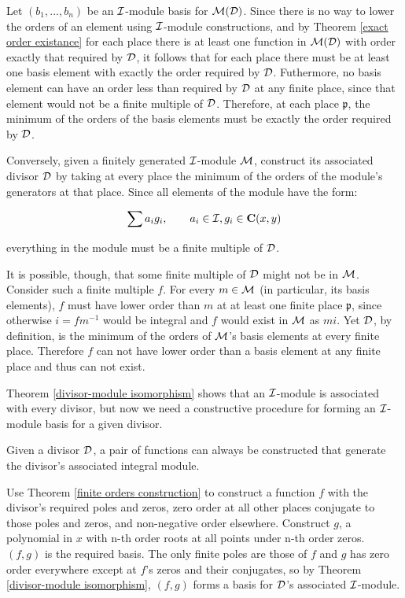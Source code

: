 Let $(b_1,...,b_n)$ be an ${\cal I}$-module basis for ${\cal M}({\cal
D})$.  Since there is no way to lower the orders of an element using
${\cal I}$-module constructions, and by Theorem \ref{exact order
existance} for each place there is at least one function in ${\cal
M}({\cal D})$ with order exactly that required by ${\cal D}$, it
follows that for each place there must be at least one basis element
with exactly the order required by ${\cal D}$.  Futhermore, no basis
element can have an order less than required by ${\cal D}$ at any
finite place, since that element would not be a finite multiple of
${\cal D}$.  Therefore, at each place $\mathfrak{p}$, the minimum of
the orders of the basis elements must be exactly the order required by
${\cal D}$.

Conversely, given a finitely generated ${\cal I}$-module ${\cal M}$,
construct its associated divisor ${\cal D}$ by taking at every place
the minimum of the orders of the module's generators at that place.
Since all elements of the module have the form:

	$$\sum a_i g_i, \qquad a_i \in {\cal I}, g_i \in {\bf C}(x,y)$$

everything in the module must be a finite multiple of ${\cal D}$.

It is possible, though, that some finite multiple of ${\cal D}$ might
not be in ${\cal M}$.  Consider such a finite multiple $f$.  For every
$m \in {\cal M}$ (in particular, its basis elements), $f$ must have
lower order than $m$ at at least one finite place $\mathfrak{p}$,
since otherwise $i = fm^{-1}$ would be integral and $f$ would exist in
${\cal M}$ as $mi$.  Yet ${\cal D}$, by definition, is the minimum of
the orders of ${\cal M}$'s basis elements at every finite place.
Therefore $f$ can not have lower order than a basis element at any
finite place and thus can not exist.

\endtheorem

Theorem \ref{divisor-module isomorphism} shows that an
${\cal I}$-module is associated with every divisor, but
now we need a constructive procedure for forming an ${\cal I}$-module
basis for a given divisor.

\theorem
\label{divisor basis construction}

Given a divisor ${\cal D}$, a pair of functions can always be
constructed that generate the divisor's associated integral module.

\proof

Use Theorem \ref{finite orders construction} to construct a function
$f$ with the divisor's required poles and zeros, zero order at all
other places conjugate to those poles and zeros, and non-negative
order elsewhere.  Construct $g$, a polynomial in $x$ with n-th order
roots at all points under n-th order zeros.  $(f,g)$ is the required
basis.  The only finite poles are those of $f$ and $g$ has zero order
everywhere except at $f$'s zeros and their conjugates, so by Theorem
\ref{divisor-module isomorphism}, $(f,g)$ forms a basis for
${\cal D}$'s associated ${\cal I}$-module.

